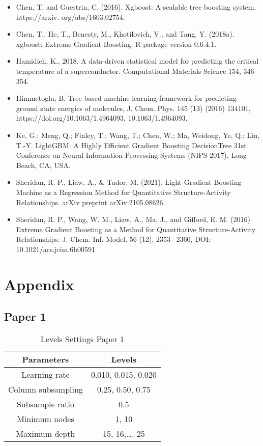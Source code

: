 \documentclass[12pt]{article}
\begin{document}
\begin{itemize}

\item Chen, T. and Guestrin, C. (2016). Xgboost: A scalable tree boosting system. https://arxiv. org/abs/1603.02754.

\item Chen, T., He, T., Benesty, M., Khotilovich, V., and Tang, Y. (2018a). xgboost: Extreme Gradient Boosting. R package version 0.6.4.1.


\item Hamidieh, K., 2018. A data-driven statistical model for predicting the critical temperature of a superconductor. Computational Materials Science 154, 346-354.


\item Himmetoglu, B. Tree based machine learning framework for predicting ground state energies of molecules, J. Chem. Phys. 145 (13) (2016) 134101, https://doi.org/10.1063/1.4964093, 10.1063/1.4964093.


\item Ke, G.; Meng, Q.; Finley, T.; Wang, T.; Chen, W.; Ma, Weidong, Ye, Q.; Liu, T.-Y. LightGBM: A Highly Efficient Gradient Boosting DecisionTree 31st Conference on Neural Information Processing Systems (NIPS 2017), Long Beach, CA, USA.

\item Sheridan, R. P., Liaw, A., \& Tudor, M. (2021). Light Gradient Boosting Machine as a Regression Method for Quantitative Structure-Activity Relationships. arXiv preprint arXiv:2105.08626.

\item Sheridan, R. P., Wang, W. M., Liaw, A., Ma, J., and Gifford, E. M. (2016) Extreme Gradient Boosting as a Method for Quantitative Structure-Activity Relationships. J. Chem. Inf. Model. 56 (12), 2353– 2360,  DOI: 10.1021/acs.jcim.6b00591


\end{itemize}

\newpage 
\section{Appendix}

\subsection{Paper 1 }



\begin{table}[!h]
 \centering
 \begin{tabular}{ | c | c |} 

 \hline
 Parameters & Levels \\
 \hline
 Learning rate &  0.010, 0.015, 0.020 \\
Column subsampling&  0.25, 0.50, 0.75 \\
Subsample ratio & 0.5 \\
Minimum nodes & 1, 10 \\
Maximum depth & 15, 16,\dots , 25 \\
 \hline 
 \end{tabular}
 \caption{Levels Settings Paper 1 }
 \end{table}
\end{document}
